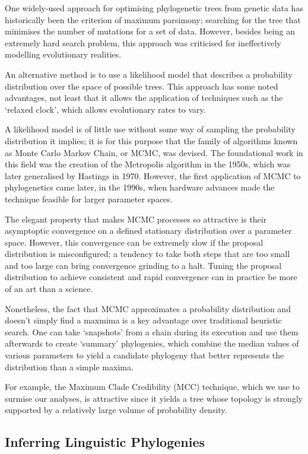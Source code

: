 \documentclass[10pt,journal,compsoc]{IEEEtran}
\begin{document}
One widely-used approach for optimising phylogenetic trees from genetic data has historically been the criterion of maximum parsimony; searching for the tree that minimises the number of mutations for a set of data. However, besides being an extremely hard search problem, this approach was criticised for ineffectively modelling evolutionary realities.

An alternative method is to use a likelihood model that describes a probability distribution over the space of possible trees. This approach has some noted advantages, not least that it allows the application of techniques such as the `relaxed clock', which allows evolutionary rates to vary.

A likelihood model is of little use without some way of sampling the probability distribution it implies; it is for this purpose that the family of algorithms known as Monte Carlo Markov Chain, or MCMC, was devised. The foundational work in this field was the creation of the Metropolis algorithm in the 1950s, which was later generalised by Hastings in 1970. However, the first application of MCMC to phylogenetics came later, in the 1990s, when hardware advances made the technique feasible for larger parameter spaces.

The elegant property that makes MCMC processes so attractive is their asymptoptic convergence on a defined stationary distribution over a parameter space. However, this convergence can be extremely slow if the proposal distribution is misconfigured; a tendency to take both steps that are too small and too large can bring convergence grinding to a halt. Tuning the proposal distribution to achieve consistent and rapid convergence can in practice be more of an art than a science.

Nonetheless, the fact that MCMC approximates a probability distribution and doesn't simply find a maxmima is a key advantage over traditional heuristic search. One can take `snapshots' from a chain during its execution and use them afterwards to create `summary' phylogenies, which combine the median values of various parameters to yield a candidate phylogeny that better represents the distribution than a simple maxima.

For example, the Maximum Clade Credibility (MCC) technique, which we use to surmise our analyses, is attractive since it yields a tree whose topology is strongly supported by a relatively large volume of probability density.

\subsection{Inferring Linguistic Phylogenies}
\end{document}
